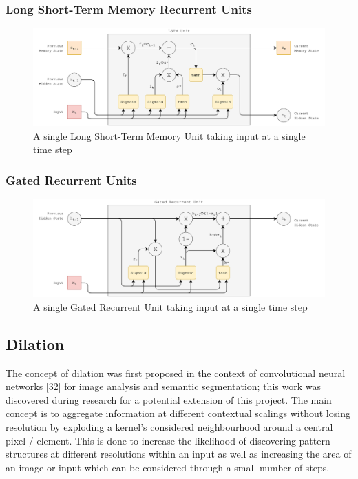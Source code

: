\documentclass[12pt,]{article}
\begin{document}
\hypertarget{long-short-term-memory-recurrent-units}{%
\subsubsection{Long Short-Term Memory Recurrent
Units}\label{long-short-term-memory-recurrent-units}}

\begin{figure}
\centering
\includegraphics{Images/lstm.png}
\caption{A single Long Short-Term Memory Unit taking input at a single
time step}
\end{figure}

\hypertarget{gated-recurrent-units}{%
\subsubsection{Gated Recurrent Units}\label{gated-recurrent-units}}

\begin{figure}
\centering
\includegraphics{Images/gru.png}
\caption{A single Gated Recurrent Unit taking input at a single time
step}
\end{figure}

\hypertarget{dilation}{%
\subsection{Dilation}\label{dilation}}

The concept of dilation was first proposed in the context of
convolutional neural networks
{[}\protect\hyperlink{ref-yu2015multi}{32}{]} for image analysis and
semantic segmentation; this work was discovered during research for a
\protect\hyperlink{sentimentalinputfromimages}{potential extension} of
this project. The main concept is to aggregate information at different
contextual scalings without losing resolution by exploding a kernel's
considered neighbourhood around a central pixel / element. This is done
to increase the likelihood of discovering pattern structures at
different resolutions within an input as well as increasing the area of
an image or input which can be considered through a small number of
steps.
\end{document}
